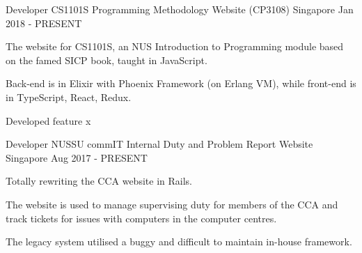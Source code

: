 

\begin{cventries}
\cventry
    {Developer} %
    {CS1101S Programming Methodology Website (CP3108)} %
    {Singapore} %
    {Jan 2018 - PRESENT} %
    {
      \begin{cvitems} %
      	\item {The website for CS1101S, an NUS Introduction to Programming module based on the famed SICP book, taught in JavaScript.}
      	\item {Back-end is in Elixir with Phoenix Framework (on Erlang VM), while front-end is in TypeScript, React, Redux.}
      	\item {Developed feature x}
      \end{cvitems}
    }
  \cventry
    {Developer} %
    {NUSSU commIT Internal Duty and Problem Report Website} %
    {Singapore} %
    {Aug 2017 - PRESENT} %
    {
      \begin{cvitems} %
      	\item {Totally rewriting the CCA website in Rails.}
      	\item {The website is used to manage supervising duty for members of the CCA and track tickets for issues with computers in the computer centres.}
      	\item {The legacy system utilised a buggy and difficult to maintain in-house framework.}
      \end{cvitems}
    }


\end{cventries}
